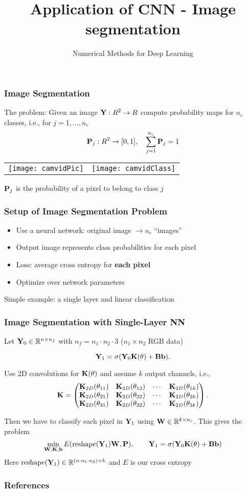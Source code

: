 \documentclass[12pt,fleqn]{beamer}
\date{}
\title{Application of CNN - Image segmentation}
\subtitle{Numerical Methods for Deep Learning}
\begin{document}
\makebeamertitle


\begin{frame}[fragile]\frametitle{Image Segmentation}

The problem:
Given an image ${\bf Y}:R^2 \rightarrow R$
compute probability maps for $n_c$ classes, i.e., for $j=1,\ldots,n_c$
$${\bf P}_j:R^2 \rightarrow [0,1], \quad \sum_{j=1}^{n_c} {\bf P}_j = 1$$

\begin{tabular}{cc}
\texttt{[image: camvidPic]} &
\texttt{[image: camvidClass]}
\end{tabular} 


${\bf P}_j$ is the probability of a pixel to belong to class $j$ 

\end{frame}

\begin{frame}[fragile]\frametitle{Setup of Image Segmentation Problem}


\begin{itemize}
\item Use a neural network: original image  $\rightarrow n_c$ ``images''
\item Output image represents class probabilities for each pixel
\item Loss: average cross entropy for \textbf{each pixel}
\item Optimize over network parameters
\end{itemize}

\bigskip

Simple example: a single layer and linear classification

\end{frame}


\begin{frame}[fragile]\frametitle{Image Segmentation with Single-Layer NN}

Let ${\bf Y}_0 \in \mathbb{R}^{n\times n_f}$ with $n_f = n_1 \cdot n_2 \cdot 3$ ($n_1\times n_2$ RGB data)

$$ {\bf Y}_1 = \sigma({\bf Y}_0 {\bf K}(\theta) + {\bf B} {\bf b}). $$

Use 2D convolutions for ${\bf K}(\theta)$ and assume $k$ output channels, i.e.,
$$ {\bf K} = \begin{pmatrix}
{\bf K}_{2D}(\theta_{11}) & {\bf K}_{2D}(\theta_{12}) & \cdots & {\bf K}_{2D}(\theta_{1k}) \\
{\bf K}_{2D}(\theta_{21}) & {\bf K}_{2D}(\theta_{22}) & \cdots & {\bf K}_{2D}(\theta_{2k}) \\
{\bf K}_{2D}(\theta_{31}) & {\bf K}_{2D}(\theta_{32}) & \cdots & {\bf K}_{2D}(\theta_{3k}) \\
\end{pmatrix}. $$

Then we have to classify each pixel in ${\bf Y}_1$ using ${\bf W} \in \mathbb{R}^{k \times n_c}$. This gives the problem
$$
\min_{{\bf W},{\bf K},{\bf b}} E({\rm reshape}({\bf Y}_1) {\bf W} , {\bf P}), \qquad {\bf Y}_1 =\sigma({\bf Y}_0 {\bf K}(\theta) + {\bf B} {\bf b})
$$
Here ${\rm reshape}({\bf Y}_1) \in \mathbb{R}^{(n\cdot n_1 \cdot n_2) \times k}$ and $E$ is our cross entropy

\end{frame}

\begin{frame}[allowframebreaks]
	\frametitle{References}



\end{frame}
\end{document}
